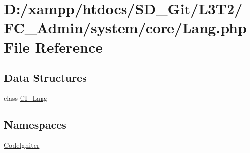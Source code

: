\hypertarget{_admin_2system_2core_2_lang_8php}{}\section{D\+:/xampp/htdocs/\+S\+D\+\_\+\+Git/\+L3\+T2/\+F\+C\+\_\+\+Admin/system/core/\+Lang.php File Reference}
\label{_admin_2system_2core_2_lang_8php}
\subsection*{Data Structures}
\begin{DoxyCompactItemize}
\item 
class \hyperlink{class_c_i___lang}{C\+I\+\_\+\+Lang}
\end{DoxyCompactItemize}
\subsection*{Namespaces}
\begin{DoxyCompactItemize}
\item 
 \hyperlink{namespace_code_igniter}{Code\+Igniter}
\end{DoxyCompactItemize}
